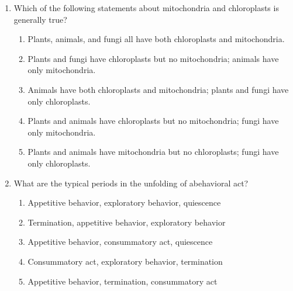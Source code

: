 \documentclass[12pt]{article}
\begin{document}
\begin{enumerate}[label=\arabic*.]
\begin{enumerate}[label=(\alph*)]
    \item Autoradiography with labelled amino acids
    \item Through protein synthesis
\end{enumerate}
\item Which of the following statements about mitochondria and chloroplasts is generally true?
\begin{enumerate}[label=(\alph*)]
    \item Plants, animals, and fungi all have both chloroplasts and mitochondria.
    \item Plants and fungi have chloroplasts but no mitochondria; animals have only mitochondria.
    \item Animals have both chloroplasts and mitochondria; plants and fungi have only chloroplasts.
    \item Plants and animals have chloroplasts but no mitochondria; fungi have only mitochondria.
    \item Plants and animals have mitochondria but no chloroplasts; fungi have only chloroplasts.
\end{enumerate}
\item What are the typical periods in the unfolding of abehavioral act?
\begin{enumerate}[label=(\alph*)]
    \item Appetitive behavior, exploratory behavior, quiescence
    \item Termination, appetitive behavior, exploratory behavior
    \item Appetitive behavior, consummatory act, quiescence
    \item Consummatory act, exploratory behavior, termination
    \item Appetitive behavior, termination, consummatory act
\end{enumerate}
\end{enumerate}
\end{document}
